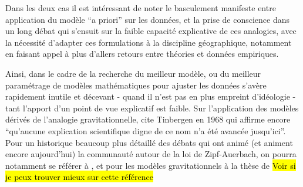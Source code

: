 Dans les deux cas il est intéressant de noter le basculement manifeste entre application du modèle \foreignquote{latin}{a priori} sur les données, et la prise de conscience dans un long débat qui s'ensuit sur la faible capacité explicative de ces analogies, avec la nécessité d'adapter ces formulations à la discipline géographique, notamment en faisant appel à plus d'allers retours entre théories et données empiriques.


Ainsi, dans le cadre de la recherche du meilleur modèle, ou du meilleur paramétrage de modèles mathématiques pour ajuster les données s'avère rapidement inutile et décevant - quand il n'est pas en plus empreint d'idéologie - tant l'apport d'un point de vue explicatif est faible. Sur l'application des modèles dérivés de l'analogie gravitationnelle, \textcite[37]{Pumain1982} cite Tinbergen en 1968 qui affirme encore \enquote{qu'aucune explication scientifique digne de ce nom n'a été avancée jusqu'ici}. Pour un historique beaucoup plus détaillé des débats qui ont animé (et animent encore aujourd'hui) la communauté autour de la loi de Zipf-Auerbach, on pourra notamment se référer à \textcite{Pumain1982,Pumain2012}, et pour les modèles gravitationnels à la thèse de \autocite{JensenButler1970} \hl{Voir si je peux trouver mieux sur cette référence}


